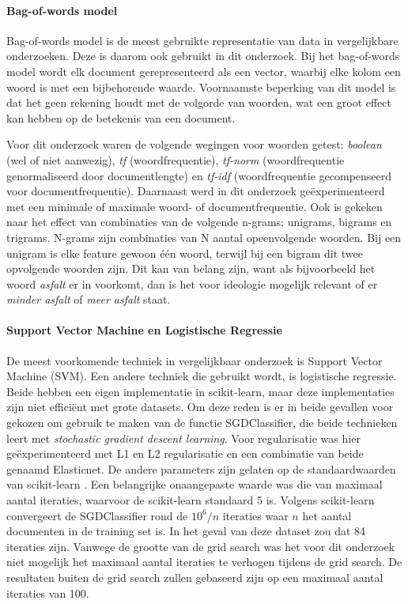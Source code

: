 \paragraph{Bag-of-words model}
Bag-of-words model is de meest gebruikte representatie van data in vergelijkbare onderzoeken. Deze is daarom ook gebruikt in dit onderzoek. Bij het bag-of-words model wordt elk document gerepresenteerd als een vector, waarbij elke kolom een woord is met een bijbehorende waarde. Voornaamste beperking van dit model is dat het geen rekening houdt met de volgorde van woorden, wat een groot effect kan hebben op de betekenis van een document.\par
Voor dit onderzoek waren de volgende wegingen voor woorden getest: \textit{boolean} (wel of niet aanwezig), \textit{tf} (woordfrequentie), \textit{tf-norm} (woordfrequentie genormaliseerd door documentlengte) en \textit{tf-idf} (woordfrequentie gecompenseerd voor documentfrequentie). Daarnaast werd in dit onderzoek geëxperimenteerd met een minimale of maximale woord- of documentfrequentie. Ook is gekeken naar het effect van combinaties van de volgende n-grams; unigrams, bigrams en trigrams. N-grams zijn combinaties van N aantal opeenvolgende woorden. Bij een unigram is elke feature gewoon één woord, terwijl bij een bigram dit twee opvolgende woorden zijn. Dit kan van belang zijn, want als bijvoorbeeld het woord \textit{asfalt} er in voorkomt, dan is het voor ideologie mogelijk relevant of er \textit{minder asfalt} of \textit{meer asfalt} staat.\par

\paragraph{Support Vector Machine en Logistische Regressie}
De meest voorkomende techniek in vergelijkbaar onderzoek is Support Vector Machine (SVM). Een andere techniek die gebruikt wordt, is logistische regressie. Beide hebben een eigen implementatie in scikit-learn, maar deze implementaties zijn niet efficiënt met grote datasets. Om deze reden is er in beide gevallen voor gekozen om gebruik te maken van de functie SGDClassifier, die beide technieken leert met \textit{stochastic gradient descent learning}. Voor regularisatie was hier geëxperimenteerd met L1 en L2 regularisatie en een combinatie van beide genaamd Elasticnet. De andere parameters zijn gelaten op de standaardwaarden van scikit-learn \cite{scikit-learn}. Een belangrijke onaangepaste waarde was die van maximaal aantal iteraties, waarvoor de scikit-learn standaard 5 is. Volgens scikit-learn convergeert de SGDClassifier rond de $10^{6}/n$ iteraties waar $n$ het aantal documenten in de training set is. In het geval van deze dataset zou dat 84 iteraties zijn. Vanwege de grootte van de grid search was het voor dit onderzoek niet mogelijk het maximaal aantal iteraties te verhogen tijdens de grid search. De resultaten buiten de grid search zullen gebaseerd zijn op een maximaal aantal iteraties van 100.\par

